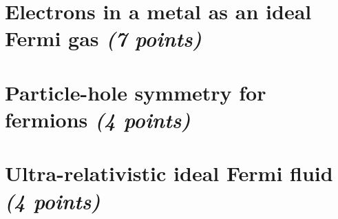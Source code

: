 \documentclass[11 pt]{article}
\begin{document}
    \section{
        Electrons in a metal as an ideal Fermi gas \textit{(7 points)}
    }
    
    \newpage

    \section{Particle-hole symmetry for fermions \textit{(4 points)}}
    
    \newpage

    \section{Ultra-relativistic ideal Fermi fluid \textit{(4 points)}}
    
    \newpage
\end{document}
